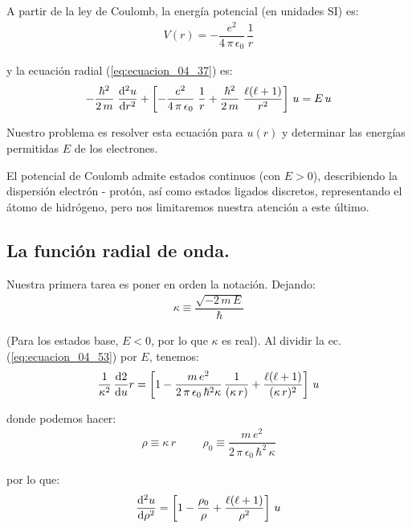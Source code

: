 A partir de la ley de Coulomb, la energía potencial (en unidades SI) es:
\begin{align}
V(r) = - \dfrac{e^{2}}{4 \, \pi \, \epsilon_{0}} \, \dfrac{1}{r}
\label{eq:ecuacion_04_52}
\end{align}

y la ecuación radial (\ref{eq:ecuacion_04_37}) es:
\begin{align}
- \dfrac{\hbar^{2}}{2 \, m} \; \dv[2]{u}{r} + \left[ - \dfrac{e^{2}}{4 \, \pi \, \epsilon_{0}} \; \dfrac{1}{r} + \dfrac{\hbar^{2}}{2 \, m} \; \dfrac{\ell(\ell +1)}{r^{2}} \right] \, u =  E \, u
\label{eq:ecuacion_04_53}
\end{align}

Nuestro problema es resolver esta ecuación para $u(r)$ y determinar las energías permitidas $E$ de los electrones. 
\par
El potencial de Coulomb admite estados continuos (con $E > 0$), describiendo la dispersión  electrón - protón, así como estados ligados discretos, representando el átomo de hidrógeno, pero nos limitaremos nuestra atención a este último.

\newpage

\subsection{La función radial de onda.}

Nuestra primera tarea es poner en orden la notación. Dejando:
\begin{align}
\kappa \equiv \dfrac{\sqrt{-2 \, m \, E}}{\hbar}
\label{eq:ecuacion_04_54}
\end{align}

(Para los estados base, $E < 0$, por lo que $\kappa$ es real). Al dividir la ec. (\ref{eq:ecuacion_04_53}) por $E$, tenemos:
\begin{align*}
\dfrac{1}{\kappa^{2}} \, \dv{2}{u}{r} = \left[1 - \dfrac{m \, e^{2}}{2 \, \pi \, \epsilon_{0} \,\hbar^{2} \kappa} \, \dfrac{1}{(\kappa \, r)} + \dfrac{\ell (\ell + 1)}{(\kappa \, r)^{2}} \right] \, u
\end{align*}

donde podemos hacer:
\begin{align}
\rho \equiv \kappa \, r \hspace{1cm} \rho_{0} \equiv \dfrac{m \, e^{2}}{2 \, \pi \, \epsilon_{0} \, \hbar^{2} \, \kappa}
\label{eq:ecuacion_04_55}
\end{align}

por lo que:
\begin{align}
\dv[2]{u}{\rho} = \left[ 1 - \dfrac{\rho_{0}}{\rho} + \dfrac{\ell (\ell + 1)}{\rho^{2}} \right] \, u
\label{eq:ecuacion_04_56}
\end{align}

